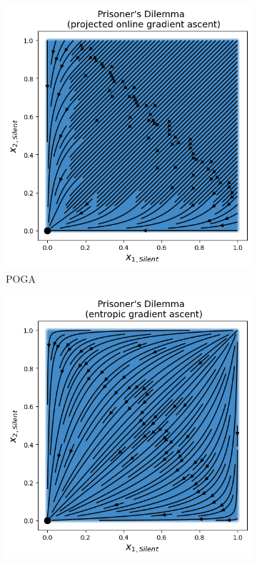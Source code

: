 \begin{figure}[H]
\captionsetup{justification=centering}
\centering
\begin{subfigure}{.5\textwidth}
    \centering
    \includegraphics[width=\textwidth]{logos/Prisoner2.png}
    \caption{POGA}
\end{subfigure}%
\begin{subfigure}{.5\textwidth}
    \centering
    \includegraphics[width=\textwidth]{logos/Prisoner3.png}

\end{subfigure}
\end{figure}
